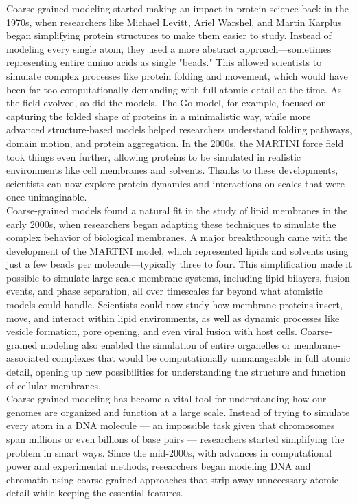 \documentclass[12pt]{article}
\begin{document}
\begin{flushleft}
Coarse-grained modeling started making an impact in protein science back in the 1970s, when researchers like Michael Levitt, Ariel Warshel, and Martin Karplus began simplifying protein structures to make them easier to study. Instead of modeling every single atom, they used a more abstract approach—sometimes representing entire amino acids as single "beads." This allowed scientists to simulate complex processes like protein folding and movement, which would have been far too computationally demanding with full atomic detail at the time. As the field evolved, so did the models. The Go model, for example, focused on capturing the folded shape of proteins in a minimalistic way, while more advanced structure-based models helped researchers understand folding pathways, domain motion, and protein aggregation. In the 2000s, the MARTINI force field took things even further, allowing proteins to be simulated in realistic environments like cell membranes and solvents. Thanks to these developments, scientists can now explore protein dynamics and interactions on scales that were once unimaginable.\\

Coarse-grained models found a natural fit in the study of lipid membranes in the early 2000s, when researchers began adapting these techniques to simulate the complex behavior of biological membranes. A major breakthrough came with the development of the MARTINI model, which represented lipids and solvents using just a few beads per molecule—typically three to four. This simplification made it possible to simulate large-scale membrane systems, including lipid bilayers, fusion events, and phase separation, all over timescales far beyond what atomistic models could handle. Scientists could now study how membrane proteins insert, move, and interact within lipid environments, as well as dynamic processes like vesicle formation, pore opening, and even viral fusion with host cells. Coarse-grained modeling also enabled the simulation of entire organelles or membrane-associated complexes that would be computationally unmanageable in full atomic detail, opening up new possibilities for understanding the structure and function of cellular membranes.\\

Coarse-grained modeling has become a vital tool for understanding how our genomes are organized and function at a large scale. Instead of trying to simulate every atom in a DNA molecule — an impossible task given that chromosomes span millions or even billions of base pairs — researchers started simplifying the problem in smart ways. Since the mid-2000s, with advances in computational power and experimental methods, researchers began modeling DNA and chromatin using coarse-grained approaches that strip away unnecessary atomic detail while keeping the essential features.


\end{flushleft}
\end{document}
